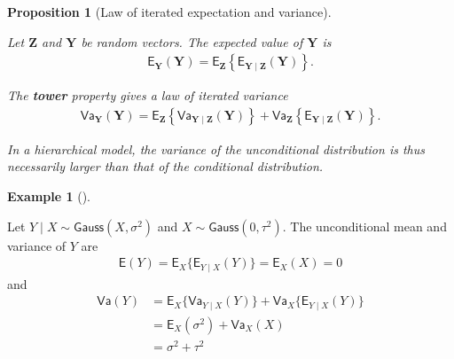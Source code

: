 \documentclass[
  11pt,
  letterpaper,
]{scrbook}
\theoremstyle{definition}
\newtheorem{example}{Example}[chapter]
\theoremstyle{plain}
\newtheorem{proposition}{Proposition}[chapter]
\theoremstyle{plain}
\theoremstyle{plain}
\theoremstyle{definition}
\theoremstyle{definition}
\theoremstyle{plain}
\newtheorem{proposition}{Proposition}[chapter]
\theoremstyle{plain}
\theoremstyle{remark}
\begin{document}
\begin{proposition}[Law of iterated expectation and
variance]\protect\hypertarget{prp-iteratedexpectation}{}\label{prp-iteratedexpectation}

Let \(\boldsymbol{Z}\) and \(\boldsymbol{Y}\) be random vectors. The
expected value of \(\boldsymbol{Y}\) is \begin{align*}
\mathsf{E}_{\boldsymbol{Y}}(\boldsymbol{Y}) = \mathsf{E}_{\boldsymbol{Z}}\left\{\mathsf{E}_{\boldsymbol{Y} \mid \boldsymbol{Z}}(\boldsymbol{Y})\right\}.
\end{align*}

The \textbf{tower} property gives a law of iterated variance
\begin{align*}
\mathsf{Va}_{\boldsymbol{Y}}(\boldsymbol{Y}) = \mathsf{E}_{\boldsymbol{Z}}\left\{\mathsf{Va}_{\boldsymbol{Y} \mid \boldsymbol{Z}}(\boldsymbol{Y})\right\} + \mathsf{Va}_{\boldsymbol{Z}}\left\{\mathsf{E}_{\boldsymbol{Y} \mid \boldsymbol{Z}}(\boldsymbol{Y})\right\}.
\end{align*}

In a hierarchical model, the variance of the unconditional distribution
is thus necessarily larger than that of the conditional distribution.

\end{proposition}

\begin{example}[]\protect\hypertarget{exm-iteratedmean-gauss}{}\label{exm-iteratedmean-gauss}

Let \(Y \mid X\sim \mathsf{Gauss}(X, \sigma^2)\) and
\(X \sim \mathsf{Gauss}(0, \tau^2).\) The unconditional mean and
variance of \(Y\) are \begin{align*}
\mathsf{E}(Y) = \mathsf{E}_{X}\{\mathsf{E}_{Y\mid X}(Y)\}= \mathsf{E}_{X}(X) = 0
\end{align*} and \begin{align*}
\mathsf{Va}(Y) &= \mathsf{E}_{X}\{\mathsf{Va}_{Y\mid X}(Y)\} + \mathsf{Va}_{X}\{\mathsf{E}_{Y\mid X}(Y)\} \\&= \mathsf{E}_{X}(\sigma^2) + \mathsf{Va}_{X}(X)
\\&= \sigma^2 + \tau^2
\end{align*}

\end{example}
\end{document}
